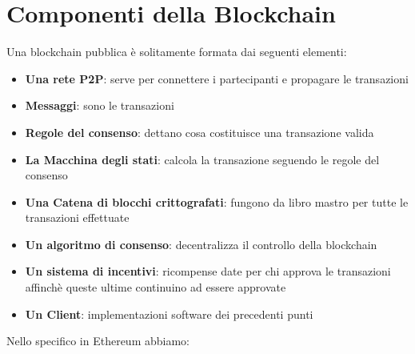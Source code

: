 \section{Componenti della Blockchain}

Una blockchain pubblica è solitamente formata dai seguenti elementi:

\begin{itemize}
      \item \textbf{Una rete P2P}: serve per connettere i partecipanti e propagare le transazioni
      \item \textbf{Messaggi}: sono le transazioni
      \item \textbf{Regole del consenso}: dettano cosa costituisce una transazione valida
      \item \textbf{La Macchina degli stati}: calcola la transazione seguendo le regole del consenso
      \item \textbf{Una Catena di blocchi crittografati}: fungono da libro mastro per tutte
            le transazioni effettuate
      \item \textbf{Un algoritmo di consenso}: decentralizza il controllo della blockchain
      \item \textbf{Un sistema di incentivi}: ricompense date per chi approva le transazioni
            affinchè queste ultime continuino ad essere approvate
      \item \textbf{Un Client}: implementazioni software dei precedenti punti
\end{itemize}

Nello specifico in Ethereum abbiamo:

